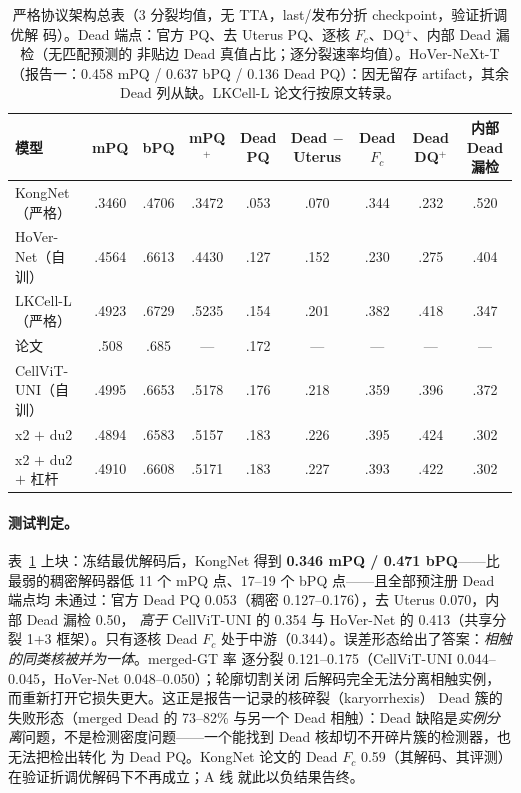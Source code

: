 \documentclass[11pt]{article}
\begin{document}
\begin{table}[t]
\centering\small
\caption{严格协议架构总表（3 分裂均值，无 TTA，last/发布分折 checkpoint，验证折调优解
码）。Dead 端点：官方 PQ、去 Uterus PQ、逐核 $F_c$、DQ$^+$、内部 Dead 漏检（无匹配预测的
非贴边 Dead 真值占比；逐分裂速率均值）。HoVer-NeXt-T（报告一：0.458 mPQ / 0.637 bPQ /
0.136 Dead PQ）：因无留存 artifact，其余 Dead 列从缺。LKCell-L 论文行按原文转录。}
\label{tab:arch}
\begin{tabular}{lcccccccc}
\toprule
模型 & mPQ & bPQ & mPQ$^+$ & \shortstack{Dead\\PQ} & \shortstack{Dead\\$-$Uterus} & \shortstack{Dead\\$F_c$} & \shortstack{Dead\\DQ$^+$} & \shortstack{内部 Dead\\漏检} \\
\midrule
KongNet（严格）   & .3460 & .4706 & .3472 & .053 & .070 & .344 & .232 & .520 \\
HoVer-Net（自训） & .4564 & .6613 & .4430 & .127 & .152 & .230 & .275 & .404 \\
LKCell-L（严格）  & .4923 & .6729 & .5235 & .154 & .201 & .382 & .418 & .347 \\
\quad 论文        & .508 & .685 & --- & .172 & --- & --- & --- & --- \\
CellViT-UNI（自训）& .4995 & .6653 & .5178 & .176 & .218 & .359 & .396 & .372 \\
\midrule
x2 $+$ du2          & .4894 & .6583 & .5157 & .183 & .226 & .395 & .424 & .302 \\
x2 $+$ du2 $+$ 杠杆 & .4910 & .6608 & .5171 & .183 & .227 & .393 & .422 & .302 \\
\bottomrule
\end{tabular}
\end{table}

\paragraph{测试判定。}表~\ref{tab:arch} 上块：冻结最优解码后，KongNet 得到 \textbf{0.346
mPQ / 0.471 bPQ}——比最弱的稠密解码器低 11 个 mPQ 点、17--19 个 bPQ 点——且全部预注册
Dead 端点均
未通过：官方 Dead PQ 0.053（稠密 0.127--0.176），去 Uterus 0.070，内部 Dead 漏检 0.50，
\emph{高于} CellViT-UNI 的 0.354 与 HoVer-Net 的 0.413（共享分裂 1+3 框架）。只有逐核
Dead $F_c$ 处于中游（0.344）。误差形态给出了答案：\emph{相触的同类核被并为一体}。merged-GT 率
逐分裂 0.121--0.175（CellViT-UNI 0.044--0.045，HoVer-Net 0.048--0.050）；轮廓切割关闭
后解码完全无法分离相触实例，而重新打开它损失更大。这正是报告一记录的核碎裂（karyorrhexis）
Dead 簇的失败形态（merged Dead 的 73--82\% 与另一个 Dead 相触）：Dead 缺陷是\emph{实例分
离}问题，不是检测密度问题——一个能找到 Dead 核却切不开碎片簇的检测器，也无法把检出转化
为 Dead PQ。KongNet 论文的 Dead $F_c$ 0.59（其解码、其评测）在验证折调优解码下不再成立；A 线
就此以负结果告终。
\end{document}
